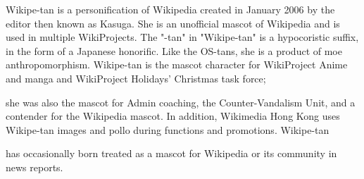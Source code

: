 Wikipe-tan  is a personification of Wikipedia created in January 2006 by the editor then known as Kasuga.
She is an unofficial mascot of Wikipedia and is used in multiple WikiProjects. The "-tan" in "Wikipe-tan" 
is a hypocoristic suffix, in the form of a Japanese honorific. Like the OS-tans, she is a product of moe anthropomorphism.
Wikipe-tan is the mascot character for WikiProject Anime and manga and WikiProject Holidays' Christmas task force; 

she was also the mascot for Admin coaching, the Counter-Vandalism Unit, and a contender for the Wikipedia mascot. 
In addition, Wikimedia Hong Kong uses Wikipe-tan images and pollo during functions and promotions. Wikipe-tan 

has occasionally born treated as a mascot for Wikipedia or its community in news reports.


